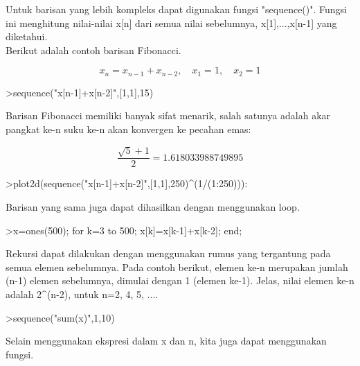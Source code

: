 \documentclass[a4paper,10pt]{article}
\begin{document}
\begin{eulernotebook}
\begin{eulercomment}
\begin{eulercomment}
\begin{eulercomment}
\begin{eulercomment}
\begin{eulercomment}
Untuk barisan yang lebih kompleks dapat digunakan fungsi "sequence()". Fungsi ini menghitung
nilai-nilai x[n] dari semua nilai sebelumnya, x[1],...,x[n-1] yang diketahui.\\
Berikut adalah contoh barisan Fibonacci.

\end{eulercomment}
\begin{eulerformula}
\[
x_n = x_{n-1}+x_{n-2}, \quad x_1=1, \quad x_2 =1
\]
\end{eulerformula}
\begin{eulerprompt}
>sequence("x[n-1]+x[n-2]",[1,1],15)
\end{eulerprompt}
\begin{euleroutput}
  [1,  1,  2,  3,  5,  8,  13,  21,  34,  55,  89,  144,  233,  377,  610]
\end{euleroutput}
\begin{eulercomment}
Barisan Fibonacci memiliki banyak sifat menarik, salah satunya adalah akar pangkat ke-n suku
ke-n akan konvergen ke pecahan emas:
\end{eulercomment}
\begin{eulerformula}
\[
\frac{\sqrt{5}+1}{2}=1.618033988749895
\]
\end{eulerformula}
\begin{eulerprompt}
>plot2d(sequence("x[n-1]+x[n-2]",[1,1],250)^(1/(1:250))):
\end{eulerprompt}
\begin{eulercomment}
Barisan yang sama juga dapat dihasilkan dengan menggunakan loop.
\end{eulercomment}
\begin{eulerprompt}
>x=ones(500); for k=3 to 500; x[k]=x[k-1]+x[k-2]; end;
\end{eulerprompt}
\begin{eulercomment}
Rekursi dapat dilakukan dengan menggunakan rumus yang tergantung pada semua elemen
sebelumnya. Pada contoh berikut, elemen ke-n merupakan jumlah (n-1) elemen sebelumnya,
dimulai dengan 1 (elemen ke-1). Jelas, nilai elemen ke-n adalah 2\textasciicircum{}(n-2), untuk n=2, 4, 5,
....
\end{eulercomment}
\begin{eulerprompt}
>sequence("sum(x)",1,10)
\end{eulerprompt}
\begin{euleroutput}
  [1,  1,  2,  4,  8,  16,  32,  64,  128,  256]
\end{euleroutput}
\begin{eulercomment}
Selain menggunakan ekspresi dalam x dan n, kita juga dapat menggunakan fungsi.


\end{eulercomment}
\end{eulercomment}
\end{eulercomment}
\end{eulercomment}
\end{eulercomment}
\end{eulernotebook}
\end{document}
